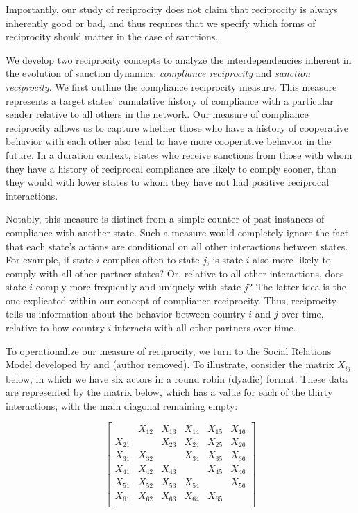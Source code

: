 Importantly, our study of reciprocity does not claim that reciprocity is always inherently good or bad, and thus requires that we specify which forms of reciprocity should matter in the case of sanctions. 


We develop two reciprocity concepts to analyze the interdependencies inherent in the evolution of sanction dynamics: \textit{compliance reciprocity} and \textit{sanction reciprocity}. We first outline the compliance reciprocity measure. This measure represents a target states' cumulative history of compliance with a particular sender relative to all others in the network. Our measure of compliance reciprocity allows us to capture whether those who have a history of cooperative behavior with each other also tend to have more cooperative behavior in the future. In a duration context, states who receive sanctions from those with whom they have a history of reciprocal compliance are likely to comply sooner, than they would with lower states to whom they have not had positive reciprocal interactions. 

Notably, this measure is distinct from a simple counter of past instances of compliance with another state. Such a measure would completely ignore the fact that each state's actions are conditional on all other interactions between states. For example, if state $i$ complies often to state $j$, is state $i$ also more likely to comply with all other partner states? Or, relative to all other interactions, does state $i$ comply more frequently and uniquely with state $j$? The latter idea is the one explicated within our  concept of compliance reciprocity. Thus, reciprocity tells us information about the behavior between country $i$ and $j$ over time, relative to how country $i$ interacts with all other partners over time. 

To operationalize our measure of reciprocity, we turn to the Social Relations Model developed by \citet{kenny1994interpersonal} and (author removed). To illustrate, consider the matrix $X_{ij}$ below, in which we have six actors in a round robin (dyadic) format. These data are represented by the matrix below, which has a value for each of the thirty interactions, with the main diagonal remaining empty:

\singlespacing
\[
\left[
\begin{array}{cccccc}
 & X_{12}  & X_{13}  & X_{14} & X_{15} & X_{16} \\
X_{21}  &  & X_{23}  & X_{24} & X_{25} & X_{26} \\
X_{31}  & X_{32}  &    & X_{34} & X_{35} & X_{36} \\
X_{41}  & X_{42}  & X_{43}  &  & X_{45} & X_{46} \\
X_{51}  & X_{52}  & X_{53}  & X_{54} &   & X_{56} \\
X_{61}  & X_{62}  & X_{63}  & X_{64} & X_{65} &   \\
\end{array}
\right]
\]

